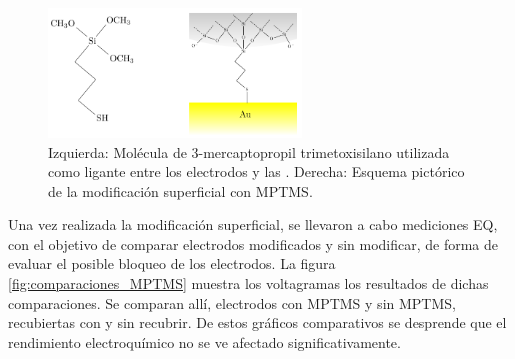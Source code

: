 					\begin{figure}[!ht]
							\begin{center}
							\includegraphics[width=0.60\textwidth]{Esquemas/mod_sup.pdf}
							\caption[Modificación superficial de los electrodos.]{Izquierda: Molécula de  3-mercaptopropil trimetoxisilano utilizada como ligante entre los electrodos y las \pdm. Derecha: Esquema pictórico de la modificación superficial con MPTMS.}
							\label{fig:mod_sup}
							\end{center}
							\end{figure}
			
			Una vez realizada la modificación superficial, se llevaron a cabo mediciones EQ, con el objetivo de comparar electrodos modificados y sin modificar, de forma de evaluar el posible bloqueo de los electrodos. La figura \ref{fig:comparaciones_MPTMS} muestra los voltagramas los resultados de dichas comparaciones. Se comparan allí, electrodos con MPTMS y sin MPTMS, recubiertas con \pdm\space y sin recubrir. De estos gráficos comparativos se desprende que el rendimiento electroquímico no se ve afectado significativamente.
	 		
